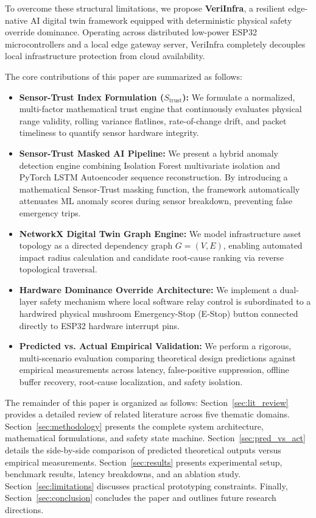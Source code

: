 \documentclass[conference]{IEEEtran}
\begin{document}
To overcome these structural limitations, we propose \textbf{VeriInfra}, a resilient edge-native AI digital twin framework equipped with deterministic physical safety override dominance. Operating across distributed low-power ESP32 microcontrollers and a local edge gateway server, VeriInfra completely decouples local infrastructure protection from cloud availability. 

The core contributions of this paper are summarized as follows:
\begin{itemize}
    \item \textbf{Sensor-Trust Index Formulation ($S_{\text{trust}}$):} We formulate a normalized, multi-factor mathematical trust engine that continuously evaluates physical range validity, rolling variance flatlines, rate-of-change drift, and packet timeliness to quantify sensor hardware integrity.
    \item \textbf{Sensor-Trust Masked AI Pipeline:} We present a hybrid anomaly detection engine combining Isolation Forest multivariate isolation and PyTorch LSTM Autoencoder sequence reconstruction. By introducing a mathematical Sensor-Trust masking function, the framework automatically attenuates ML anomaly scores during sensor breakdown, preventing false emergency trips.
    \item \textbf{NetworkX Digital Twin Graph Engine:} We model infrastructure asset topology as a directed dependency graph $G=(V, E)$, enabling automated impact radius calculation and candidate root-cause ranking via reverse topological traversal.
    \item \textbf{Hardware Dominance Override Architecture:} We implement a dual-layer safety mechanism where local software relay control is subordinated to a hardwired physical mushroom Emergency-Stop (E-Stop) button connected directly to ESP32 hardware interrupt pins.
    \item \textbf{Predicted vs. Actual Empirical Validation:} We perform a rigorous, multi-scenario evaluation comparing theoretical design predictions against empirical measurements across latency, false-positive suppression, offline buffer recovery, root-cause localization, and safety isolation.
\end{itemize}

The remainder of this paper is organized as follows: Section~\ref{sec:lit_review} provides a detailed review of related literature across five thematic domains. Section~\ref{sec:methodology} presents the complete system architecture, mathematical formulations, and safety state machine. Section~\ref{sec:pred_vs_act} details the side-by-side comparison of predicted theoretical outputs versus empirical measurements. Section~\ref{sec:results} presents experimental setup, benchmark results, latency breakdowns, and an ablation study. Section~\ref{sec:limitations} discusses practical prototyping constraints. Finally, Section~\ref{sec:conclusion} concludes the paper and outlines future research directions.
\end{document}

